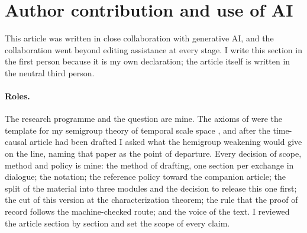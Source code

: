 %
%

\section*{Author contribution and use of AI}

This article was written in close collaboration with generative AI, and the collaboration
went beyond editing assistance at every stage. I write this section in the first person
because it is my own declaration; the article itself is written in the neutral third person.

\paragraph{Roles.} The research programme and the question are mine. The axioms of
 were the template for my semigroup theory of temporal scale
space , and after the time-causal article had been drafted I
asked what the hemigroup weakening would give on the line, naming that paper as the point of
departure. Every decision of scope, method and policy is mine: the method of drafting, one
section per exchange in dialogue; the notation; the reference policy toward the companion
article; the split of the material into three modules and the decision to release this one
first; the cut of this version at the characterization theorem; the rule that the proof of
record follows the machine-checked route; and the voice of the text. I reviewed the article
section by section and set the scope of every claim.

